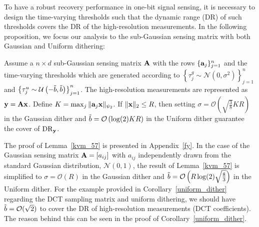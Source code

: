 \documentclass[12pt,draftcls,onecolumn]{IEEEtran}
\def\bt{\Tilde{b}}
\begin{document}
To have a robust recovery performance in one-bit signal sensing, it is necessary to design the time-varying thresholds such that the dynamic range (DR) of such thresholds covers the DR of the high-resolution measurements. In the following proposition,
we focus our analysis to the sub-Gaussian
sensing matrix with both Gaussian and Uniform dithering:
\begin{lemma}
\label{kvm_57}
Assume a $n\times d$ sub-Gaussian sensing matrix $\mathbf{A}$ with the rows $\{\mathbf{a}_j\}_{j=1}^{n}$ 
and the time-varying thresholds which %
are generated according to $\left\{\tau_{j}^{g}\sim \mathcal{N}\left(0,\sigma^2\right)\right\}_{j=1}^{n}$ and $\left\{\tau_{j}^{u}\sim \mathcal{U}\left(-\Tilde{b},\Tilde{b}\right)\right\}_{j=1}^{n}$. The high-resolution measurements are represented as $\mathbf{y}=\mathbf{A}\mathbf{x}$. Define $K=\max_j\|\mathbf{a}_j\mathbf{x}\|_{\psi_2}$. If $\|\mathbf{x}\|_2\leq R$, then setting $\sigma=\mathcal{O}\left(\sqrt{\frac{3}{8}}K R\right)$ in the Gaussian dither and  $\Tilde{b}=\mathcal{O}\left(\log(2) KR\right)$ in the Uniform dither guarantee the cover of $\mathrm{DR}_{\mathbf{y}}$.
\end{lemma}
The proof of Lemma~\ref{kvm_57} is presented in Appendix~\ref{fy}. In the case of the Gaussian sensing matrix $\mathbf{A}=[a_{ij}]$ with $a_{ij}$ independently drawn from the standard Gaussian distribution, $\mathcal{N}(0,1)$, the result of Lemma~\ref{kvm_57}
is simplified to $\sigma=\mathcal{O}(R)$ in the Gaussian dither and $\Tilde{b}=\mathcal{O}\left(R\log(2)\sqrt{\frac{8}{3}}\right)$ in the Uniform dither. For the example provided in Corollary~\ref{uniform_dither} regarding the DCT sampling matrix and uniform dithering, we should have $\bt=\mathcal{O}(\sqrt{2})$ to cover the DR of high-resolution measurements (DCT coefficients). The reason behind this can be seen in the proof of Corollary~\ref{uniform_dither}.
\end{document}
